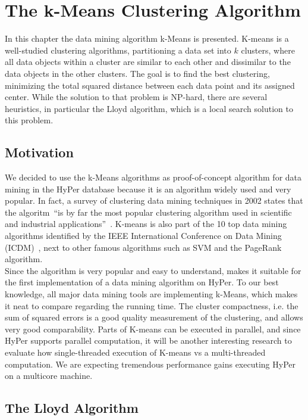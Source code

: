 \chapter{The k-Means Clustering Algorithm}\label{chapter:kmeans}

In this chapter the data mining algorithm k-Means is presented. K-means is a well-studied clustering algorithms, partitioning a data set into $k$ clusters, where all data objects within a cluster are similar to each other and dissimilar to the data objects in the other clusters. The goal is to find the best clustering, minimizing the total squared distance between each data point and its assigned center. While the solution to that problem is NP-hard, there are several heuristics, in particular the Lloyd algorithm, which is a local search solution to this problem.

\section{Motivation}
 
We decided to use the k-Means algorithms as proof-of-concept algorithm for data mining in the HyPer database because it is an algorithm widely used and very popular. In fact, a survey of clustering data mining techniques in 2002 states that the algoritm~\enquote{is by far the most popular clustering algorithm used in scientific and industrial applications}~\parencite{berkhin2002survey}. K-means is also part of the 10 top data mining algorithms identified by the IEEE International Conference on Data Mining (ICDM)~\parencite{top10}, next to other famous algorithms such as SVM and the PageRank algorithm. 
\\
Since the algorithm is very popular and easy to understand, makes it suitable for the first implementation of a data mining algorithm on HyPer. To our best knowledge, all major data mining tools are implementing k-Means, which makes it neat to compare regarding the running time. The cluster compactness, i.e. the sum of squared errors is a good quality measurement of the clustering, and allows very good comparability. 
Parts of K-means can be executed in parallel, and since HyPer supports parallel computation, it will be another interesting research to evaluate how single-threaded execution of K-means vs a multi-threaded computation. We are expecting tremendous performance gains executing HyPer on a multicore machine.

\section{The Lloyd Algorithm}

